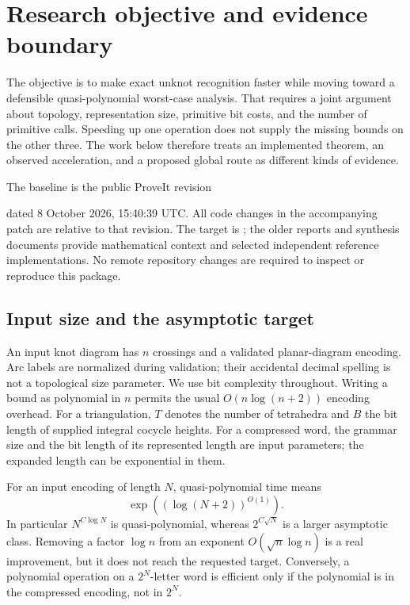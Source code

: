 \section{Research objective and evidence boundary}
\label{sec:scope}

The objective is to make exact unknot recognition faster while moving toward
a defensible quasi-polynomial worst-case analysis. That requires a joint
argument about topology, representation size, primitive bit costs, and the
number of primitive calls. Speeding up one operation does not supply the
missing bounds on the other three. The work below therefore treats an
implemented theorem, an observed acceleration, and a proposed global route
as different kinds of evidence.

The baseline is the public ProveIt revision
\begin{center}\small\baseline\end{center}
dated 8 October 2026, 15:40:39 UTC. All code changes in the accompanying patch
are relative to that revision. The target is
; the older reports and synthesis
documents provide mathematical context and selected independent reference
implementations. No remote repository changes are required to inspect or
reproduce this package.

\subsection{Input size and the asymptotic target}

An input knot diagram has $n$ crossings and a validated planar-diagram
encoding. Arc labels are normalized during validation; their accidental
decimal spelling is not a topological size parameter. We use bit complexity
throughout. Writing a bound as polynomial in $n$ permits the usual
$O(n\log(n+2))$ encoding overhead. For a triangulation, $T$ denotes the number
of tetrahedra and $B$ the bit length of supplied integral cocycle heights.
For a compressed word, the grammar size and the bit length of its represented
length are input parameters; the expanded length can be exponential in them.

For an input encoding of length $N$, quasi-polynomial time means
\[
 \exp\!\left((\log(N+2))^{O(1)}\right).
\]
In particular $N^{C\log N}$ is quasi-polynomial, whereas
$2^{C\sqrt N}$ is a larger asymptotic class. Removing a factor $\log n$ from
an exponent $O(\sqrt n\log n)$ is a real improvement, but it does not reach
the requested target. Conversely, a polynomial operation on a $2^N$-letter
word is efficient only if the polynomial is in the compressed encoding,
not in $2^N$.

